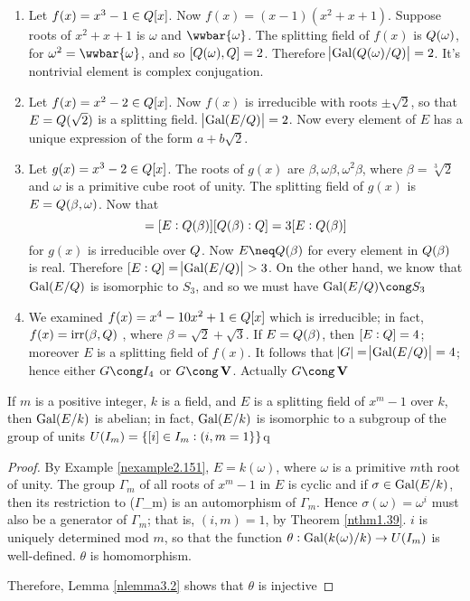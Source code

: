 \documentclass[11pt]{article}
\begin{document}
\begin{examplle}[]
\begin{enumerate}
\item Let \(f(x)=x^3-1\in\relax{Q}[x]\). Now \(f(x)=(x-1)(x^2+x+1)\). Suppose roots of
\(x^2+x+1\) is \(\omega\) and \(\wwbar{\omega}\). The splitting field of
\(f(x)\) is \(\relax{Q}(\omega)\), for \(\omega^2=\wwbar{\omega}\), and so \([\relax{Q}(\omega),\relax{Q}]=2\).
Therefore \(\abs{\operatorname{Gal}(\relax{Q}(\omega)/\relax{Q})}=2\). It's nontrivial element is complex conjugation.
\item Let \(f(x)=x^2-2\in\relax{Q}[x]\). Now \(f(x)\) is irreducible with roots
\(\pm\sqrt{2}\), so that \(E=\relax{Q}(\sqrt{2})\) is a splitting field.
\(\abs{\operatorname{Gal}(E/\relax{Q})}=2\). Now every element of \(E\) has a unique expression
of the form \(a+b\sqrt{2}\).
\item Let \(g(x)=x^3-2\in\relax{Q}[x]\). The roots of \(g(x)\) are
\(\beta,\omega\beta,\omega^2\beta\), where \(\beta=\sqrt[3]{2}\) and \(\omega\) is a
primitive cube root of unity. The splitting field of \(g(x)\) is
\(E=\relax{Q}(\beta,\omega)\). Now that 
\begin{equation*}
[E:\Q]=[E:\Q(\beta)][\Q(\beta):\Q]=3[E:\Q(\beta)]
\end{equation*}
for \(g(x)\) is irreducible over \(\relax{Q}\). Now \(E\neq\Q(\beta)\) for every
element in \(\relax{Q}(\beta)\) is real. Therefore \([E:\relax{Q}]=\abs{\operatorname{Gal}(E/\relax{Q})}>3\). On the
other hand, we know that \(\operatorname{Gal}(E/\relax{Q})\) is isomorphic to \(S_3\), and so
we must have \(\Gal(E/\Q)\cong S_3\)
\item We examined \(f(x)=x^4-10x^2+1\in\relax{Q}[x]\) which is irreducible; in fact,
\(f(x)=\operatorname{irr}(\beta,\relax{Q})\) , where \(\beta=\sqrt{2}+\sqrt{3}\). If \(E=\relax{Q}(\beta)\),
then \([E:\relax{Q}]=4\); moreover \(E\) is a splitting field of \(f(x)\). It follows
that \(\abs{G}=\abs{\operatorname{Gal}(E/\relax{Q})}=4\); hence either \(G\cong\I_4\) or
\(G\cong\bV\). Actually \(G\cong\bV\)
\end{enumerate}
\end{examplle}

\begin{proposition}[]
\label{nprop3.12}
If \(m\) is a positive integer, \(k\) is a field, and \(E\) is a splitting field of
\(x^m-1\) over \(k\), then \(\operatorname{Gal}(E/k)\) is abelian; in fact, \(\operatorname{Gal}(E/k)\) is
isomorphic to a subgroup of the group of units \(U(\relax{I}_m)=\{[i]\in\relax{I}_m:(i,m=1\}\}\)q
\end{proposition}

\begin{proof}
By Example \ref{nexample2.151}, \(E=k(\omega)\), where \(\omega\) is a primitive \(m\)th root
of unity. The group \(\Gamma_m\) of all roots of \(x^m-1\) in \(E\) is cyclic
and if \(\sigma\in\operatorname{Gal}(E/k)\), then its restriction to (\(\Gamma\)\_m) is an
automorphism of \(\Gamma_m\). Hence \(\sigma(\omega)=\omega^i\) must also be a
generator of \(\Gamma_m\); that is, \((i,m)=1\), by Theorem \ref{nthm1.39}. \(i\)
is uniquely determined mod \(m\), so that the function 
\(\theta:\operatorname{Gal}(k(\omega)/k)\to U(\relax{I}_m)\) is well-defined. \(\theta\) is homomorphism.

Therefore, Lemma \ref{nlemma3.2} shows that \(\theta\) is injective
\end{proof}
\end{document}
